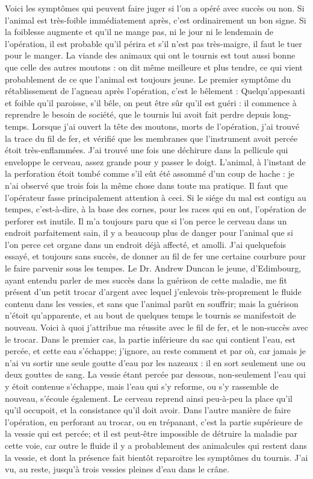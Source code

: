 Voici les symptômes qui peuvent faire juger si l'on a opéré avec succès ou non. Si l'animal est très-foible immédiatement après, c'est ordinairement un bon signe. Si la foiblesse augmente et qu'il ne mange pas, ni le jour ni le lendemain de l'opération, il est probable qu'il périra et s'il n'est pas très-maigre, il faut le tuer pour le manger. La\setcounter{page}{255} viande des animaux qui ont le tournis est tout aussi bonne que celle des autres moutons : on dit même meilleure et plus tendre, ce qui vient probablement de ce que l'animal est toujours jeune.
Le premier symptôme du rétablissement de l'agneau après l'opération, c'est le bêlement : Quelqu'appesanti et foible qu'il paroisse, s'il bêle, on peut être sûr qu'il est guéri : il commence à reprendre le besoin de société, que le tournis lui avoit fait perdre depuis long-temps.
Lorsque j'ai ouvert la tête des moutons, morts de l'opération, j'ai trouvé la trace du fil de fer, et vérifié que les membranes que l'instrument avoit percée étoit très-enflammées. J'ai trouvé une fois une déchirure dans la pellicule qui enveloppe le cerveau, assez grande pour y passer le doigt. L'animal, à l'instant de la perforation étoit tombé comme s'il eût été assommé d'un coup de hache : je n'ai observé que trois fois la même chose dans toute ma pratique.
Il faut que l'opérateur fasse principalement attention à ceci. Si le siége du mal est contigu au tempes, c'est-à-dire, à la base des cornes, pour les races qui en ont, l'opération de perforer est inutile. Il m'a toujours paru que si l'on perce le cerveau dans un\setcounter{page}{256} endroit parfaitement sain, il y a beaucoup plus de danger pour l'animal que si l'on perce cet organe dans un endroit déjà affecté, et amolli. J'ai quelquefois essayé, et toujours sans succès, de donner au fil de fer une certaine courbure pour le faire parvenir sous les tempes. Le Dr. Andrew Duncan le jeune, d'Edimbourg, ayant entendu parler de mes succès dans la guérison de cette maladie, me fit présent d'un petit trocar d'argent avec lequel j'enlevois très-proprement le fluide contenu dans les vessies, et sans que l'animal parût en souffrir; mais la guérison n'étoit qu'apparente, et au bout de quelques temps le tournis se manifestoit de nouveau.
Voici à quoi j'attribue ma réussite avec le fil de fer, et le non-succès avec le trocar. Dans le premier cas, la partie inférieure du sac qui contient l'eau, est percée, et cette eau s'échappe; j'ignore, au reste comment et par où, car jamais je n'ai vu sortir une seule goutte d'eau par les nazeaux : il en sort seulement une ou deux gouttes de sang. La vessie étant percée par dessous, non-seulement l'eau qui y étoit contenue s'échappe, mais l'eau qui s'y reforme, ou s'y rassemble de nouveau, s'écoule également. Le cerveau reprend ainsi peu-à-peu la place qu'il\setcounter{page}{257} qu'il occupoit, et la consistance qu'il doit avoir. Dans l'autre manière de faire l'opération, en perforant au trocar, ou en trépanant, c'est la partie supérieure de la vessie qui est percée; et il est peut-être impossible de détruire la maladie par cette voie, car outre le fluide il y a probablement des animalcules qui restent dans la vessie, et dont la présence fait bientôt reparoitre les symptômes du tournis. J'ai vu, au reste, jusqu'à trois vessies pleines d'eau dans le crâne.
